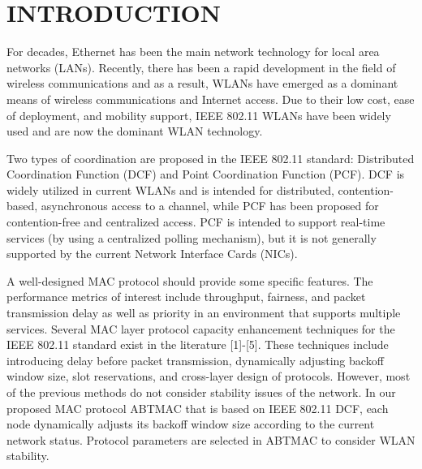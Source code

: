 \documentclass[10pt,twocolumn,oneside,submit]{JCNtran}
\begin{document}
\section{\uppercase{Introduction}}
\label{sec:introd}
\par For decades, Ethernet has been the main network technology for local area networks (LANs). Recently, there has been a rapid development in the field of wireless communications and as a result, WLANs have emerged as a dominant means of wireless communications and Internet access. Due to their low cost, ease of deployment, and mobility support, IEEE 802.11 WLANs have been widely used and are now the dominant WLAN technology.
\par Two types of coordination are proposed in the IEEE 802.11 standard: Distributed Coordination Function (DCF) and Point Coordination Function (PCF). DCF is widely utilized in current WLANs and is intended for distributed, contention-based, asynchronous access to a channel, while PCF has been proposed for contention-free and centralized access. PCF is intended to support real-time services (by using a centralized polling mechanism), but it is not generally supported by the current Network Interface Cards (NICs).
\par A well-designed MAC protocol should provide some specific features. The performance metrics of interest include throughput, fairness, and packet transmission delay as well as priority in an environment that supports multiple services. Several MAC layer protocol capacity enhancement techniques for the IEEE 802.11 standard exist in the literature [1]-[5]. These techniques include introducing delay before packet transmission, dynamically adjusting backoff window size, slot reservations, and cross-layer design of protocols. However, most of the previous methods do not consider stability issues of the network. In our proposed MAC protocol ABTMAC that is based on IEEE 802.11 DCF, each node dynamically adjusts its backoff window size according to the current network status. Protocol parameters are selected in ABTMAC to consider WLAN stability.
\end{document}
